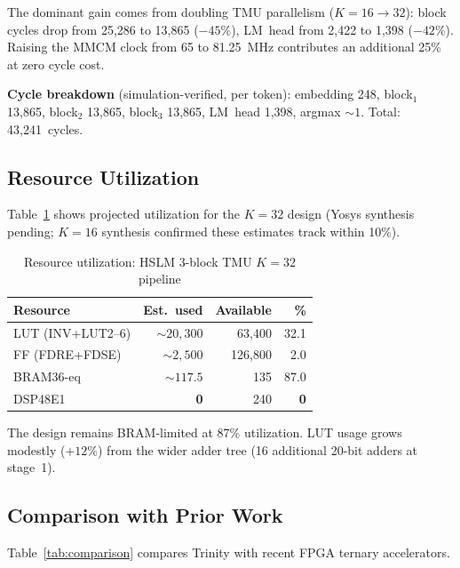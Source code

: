 \documentclass[conference]{IEEEtran}
\begin{document}
The dominant gain comes from doubling TMU parallelism ($K\!=\!16 \to 32$):
block cycles drop from 25,286 to 13,865 ($-45\%$), LM~head from 2,422
to 1,398 ($-42\%$).  Raising the MMCM clock from 65 to 81.25~MHz contributes
an additional 25\% at zero cycle cost.

\textbf{Cycle breakdown} (simulation-verified, per token):
embedding 248, block$_1$ 13,865, block$_2$ 13,865, block$_3$ 13,865,
LM~head 1,398, argmax ${\sim}1$.  Total: 43,241~cycles.

\subsection{Resource Utilization}

Table~\ref{tab:resources} shows projected utilization for the $K\!=\!32$
design (Yosys synthesis pending; $K\!=\!16$ synthesis confirmed these
estimates track within 10\%).

\begin{table}[t]
\centering
\caption{Resource utilization: HSLM 3-block TMU $K\!=\!32$ pipeline}
\label{tab:resources}
\begin{tabular}{@{}lrrr@{}}
\toprule
\textbf{Resource} & \textbf{Est.\ used} & \textbf{Available} & \textbf{\%} \\
\midrule
LUT (INV+LUT2--6) & ${\sim}20{,}300$ & 63,400 & 32.1 \\
FF (FDRE+FDSE)     & ${\sim}2{,}500$  & 126,800 & 2.0 \\
BRAM36-eq          & ${\sim}117.5$ & 135     & 87.0 \\
DSP48E1            & \textbf{0} & 240 & \textbf{0} \\
\bottomrule
\end{tabular}
\end{table}

The design remains BRAM-limited at 87\% utilization.  LUT usage grows
modestly ($+12\%$) from the wider adder tree (16 additional 20-bit adders
at stage~1).

\subsection{Comparison with Prior Work}

Table~\ref{tab:comparison} compares Trinity with recent FPGA ternary
accelerators.
\end{document}
